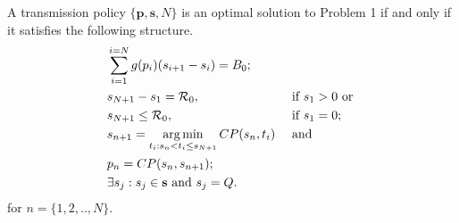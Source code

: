 \begin{theorem}
A transmission policy $\{\textbf{p},\textbf{s},N\}$ is an optimal solution to Problem 1 if and only if it satisfies the following structure.
\label{th_algo1_1}
\begin{align}
&\sum_{i=1}^{i=N}g(p_i)(s_{i+1}-s_i)=B_0; 								&&
\label{claim1}
\\
&\nonumber s_{N+1}-s_1=\mathcal{R}_0, 	  								&&\text{ if } s_1>0 \text{ or }
\\
& s_{N+1}\le \mathcal{R}_0,												&&\text{ if } s_1=0;
\label{claim2}
\\
& \nonumber s_{n+1}=\argmin_{t_i: s_n < t_i \le s_{N+1}} CP(s_n,t_i) 	&&\text{ and }
\\
&p_n=CP(s_{n},s_{n+1});\label{claim3}									&&
\\
&\exists s_j:s_j\in \textbf{s} \text{ and } s_j=Q.						&&
\label{claim4}
\end{align}
for $n=\{ 1,2,..,N\}$.
\end{theorem}
